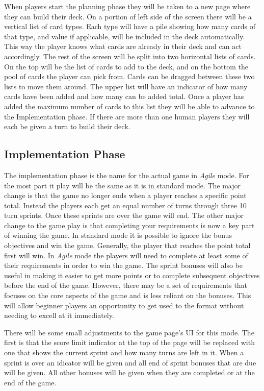 When players start the planning phase they will be taken to a new page where they
can build their deck. On a portion of left side of the screen there will be a vertical
list of card types. Each type will have a pile showing how many cards of that type,
and value if applicable, will be included in the deck automatically. This way the
player knows what cards are already in their deck and can act accordingly. The rest of
the screen will be split into two horizontal lists of cards. On the top will be the
list of cards to add to the deck, and on the bottom the pool of cards the player can
pick from. Cards can be dragged between these two lists to move them around. The
upper list will have an indicator of how many cards have been added and how many
can be added total. Once a player has added the maximum number of cards to this list
they will be able to advance to the Implementation phase. If there are more than one
human players they will each be given a turn to build their deck.

\subsection{Implementation Phase}
The implementation phase is the name for the actual game in \emph{Agile} mode. For
the most part it play will be the same as it is in standard mode. The major change
is that the game no longer ends when a player reaches a specific point total. Instead
the players each get an equal number of turns through three 10 turn sprints. Once
these sprints are over the game will end. The other major change to the game play
is that completing your requirements is now a key part of winning the game. In standard
mode it is possible to ignore the bonus objectives and win the game. Generally, the
player that reaches the point total first will win. In \emph{Agile} mode the players
will need to complete at least some of their requirements in order to win the game. The
sprint bonuses will also be useful in making it easier to get more points or to
complete subsequent objectives before the end of the game. However, there may be
a set of requirements that focuses on the core aspects of the game and is less
reliant on the bonuses. This will allow beginner players an opportunity to get
used to the format without needing to excell at it immediately.

There will be some small adjustments to the game page's UI for this mode. The
first is that the score limit indicator at the top of the page will be replaced
with one that shows the current sprint and how many turns are left in it. When
a sprint is over an idicator will be given and all end of sprint bonuses that are
due will be given. All other bonuses will be given when they are completed or at
the end of the game.

